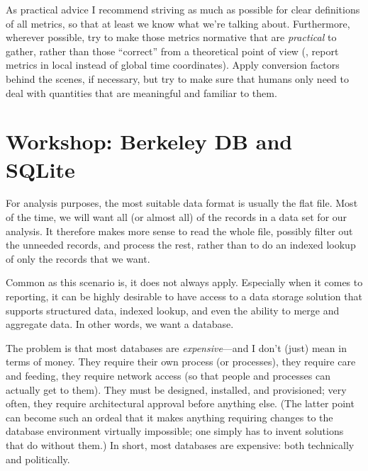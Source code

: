 As practical advice I recommend striving as much as possible for clear
definitions of all metrics, so that at least we know what we're
talking about. Furthermore, wherever possible, try to make those
metrics normative that are \emph{practical} to gather, rather than
those ``correct'' from a theoretical point of view (\eg, report
metrics in local instead of global time coordinates). Apply conversion
factors behind the scenes, if necessary, but try to make sure that
humans only need to deal with quantities that are meaningful and
familiar to them.


\vspace*{-9pt}
\section{Workshop: Berkeley DB and SQLite}


For analysis purposes, the most suitable data format is usually the
flat file. Most of the time, we will want all (or almost all) of the
records in a data set for our analysis. It therefore makes more sense
to read the whole file, possibly filter out the unneeded records, and
process the rest, rather than to do an indexed lookup of only the
records that we want.

Common as this scenario is, it does not always apply. Especially when
it comes to reporting, it can be highly desirable to have access to a
data storage solution that supports structured data, indexed lookup,
and even the ability to merge and aggregate data. In other words, 
we want a database.

The problem is that most databases are \emph{expensive}---and I don't
(just) mean in terms of money. They require their own process (or
processes), they require care and feeding, they require network access
(so that people and processes can actually get to them). They must be
designed, installed, and provisioned; very often, they require
architectural approval before anything else.  (The latter point can
become such an ordeal that it makes anything requiring changes to the
database environment virtually impossible; one simply has to invent
solutions that do without them.)  In short, most databases are
expensive: both technically and politically.

